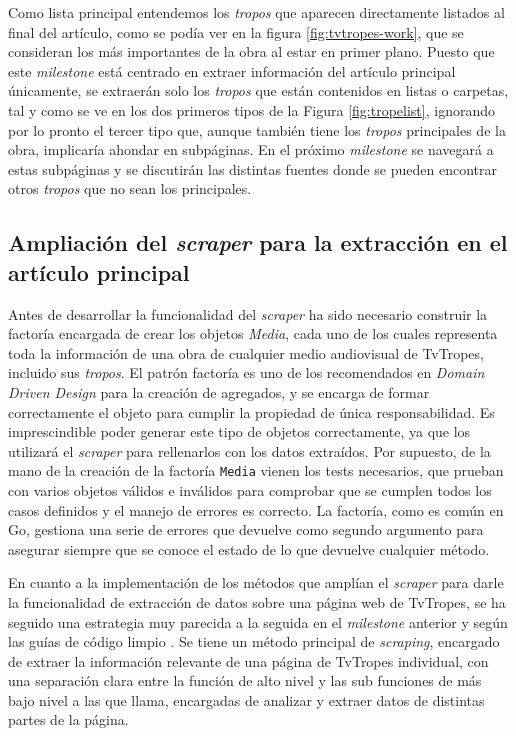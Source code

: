 Como lista principal entendemos los \textit{tropos} que aparecen directamente
listados al final del artículo, como se podía ver en la figura
\ref{fig:tvtropes-work}, que se consideran los más importantes de la obra al
estar en primer plano. Puesto que este \textit{milestone} está centrado en
extraer información del artículo principal únicamente, se extraerán solo los
\textit{tropos} que están contenidos en listas o carpetas, tal y como se ve en
los dos primeros tipos de la Figura \ref{fig:tropelist}, ignorando por lo pronto
el tercer tipo que, aunque también tiene los \textit{tropos} principales de la
obra, implicaría ahondar en subpáginas. En el próximo \textit{milestone} se
navegará a estas subpáginas y se discutirán las distintas fuentes donde se
pueden encontrar otros \textit{tropos} que no sean los principales.

\subsection{Ampliación del \textit{scraper} para la extracción en el artículo
principal} 

Antes de desarrollar la funcionalidad del \textit{scraper} ha sido necesario
construir la factoría encargada de crear los objetos \textit{Media}, cada uno de
los cuales representa toda la información de una obra de cualquier medio
audiovisual de TvTropes, incluido sus \textit{tropos}. El patrón factoría es uno
de los recomendados en \textit{Domain Driven Design} para la creación de
agregados, y se encarga de formar correctamente el objeto para cumplir la
propiedad de única responsabilidad. Es imprescindible poder generar este tipo de
objetos correctamente, ya que los utilizará el \textit{scraper} para rellenarlos
con los datos extraídos. Por supuesto, de la mano de la creación de la factoría \texttt{Media} 
vienen los tests necesarios, que prueban con varios objetos
válidos e inválidos para comprobar que se cumplen todos los casos definidos y el
manejo de errores es correcto. La factoría, como es común en Go, gestiona una
serie de errores que devuelve como segundo argumento para asegurar siempre que
se conoce el estado de lo que devuelve cualquier método.

En cuanto a la implementación de los métodos que amplían el \textit{scraper}
para darle la funcionalidad de extracción de datos sobre una página web de
TvTropes, se ha seguido una estrategia muy parecida a la seguida en el
\textit{milestone} anterior y según las guías de código limpio
\cite{clean_code_rules}. Se tiene un método principal de \textit{scraping},
encargado de extraer la información relevante de una página de TvTropes
individual, con una separación clara entre la función de alto nivel y las sub
funciones de más bajo nivel a las que llama, encargadas de analizar y extraer
datos de distintas partes de la página.

